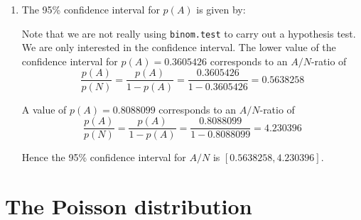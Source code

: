 \begin{enumerate}
\item\label{it:binomtest} The 95\% confidence interval for $p(A)$ is
  given by:


Note that we are not really using \texttt{binom.test} to carry out a
hypothesis test. We are only interested in the confidence interval.
The lower value of the confidence interval for $p(A)=0.3605426$
corresponds to an $A/N$-ratio of
\[
\frac{p(A)}{p(N)} = \frac{p(A)}{1-p(A)} =
\frac{0.3605426}{1-0.3605426} = 0.5638258
\]

A value of $p(A)=0.8088099$ corresponds to an $A/N$-ratio of
\[
\frac{p(A)}{p(N)} = \frac{p(A)}{1-p(A)} =
\frac{0.8088099}{1-0.8088099} = 4.230396
\]

Hence the 95\% confidence interval for $A/N$ is
$[0.5638258,4.230396]$.

\end{enumerate}
  
\section{The Poisson distribution}
\label{sec:sol-poisson}

